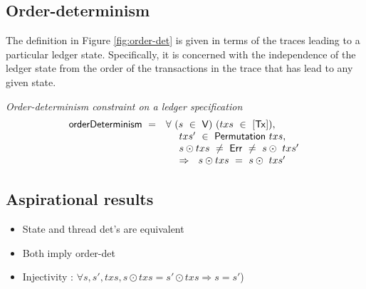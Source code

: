 \subsection{Order-determinism}
\label{sec:order-det}

The definition in Figure \ref{fig:order-det} is given in terms of the traces leading
to a particular ledger state. Specifically, it is concerned with the independence of the
ledger state from the order
of the transactions in the trace that has lead to any given state.

\begin{figure*}[htb]
  \emph{Order-determinism constraint on a ledger specification}
  \begin{equation*}
    \begin{array}{l@{~~}l@{~~}ll}
    \fun{orderDeterminism} ~=~ & \forall~(s~\in~\V)~(txs~\in~[\Tx]),~\\
    & ~~~~txs'~\in~\fun{Permutation}~txs,~\\
    & ~~~~s\odot txs~\neq~\Err~\neq~s \odot~txs' \\
    & ~~~~\Rightarrow~~s\odot txs~=~s \odot~txs'
    \end{array}
  \end{equation*}
  \caption{Order-determinism}
  \label{fig:order-det}
\end{figure*}


\subsection{Aspirational results}

\begin{itemize}
  \item[(i)] State and thread det's are equivalent
  \item[(ii)] Both imply order-det
  \item[(iii)] Injectivity : $\forall s, s', txs, s \odot txs = s' \odot txs \Rightarrow s = s'$)
\end{itemize}

%
%
%
